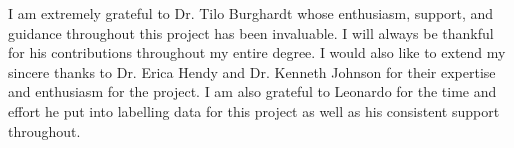 I am extremely grateful to Dr. Tilo Burghardt whose enthusiasm, support, and guidance throughout this project has been invaluable. I will always be thankful for his contributions throughout my entire degree. I would also like to extend my sincere thanks to Dr. Erica Hendy and Dr. Kenneth Johnson for their expertise and enthusiasm for the project. I am also grateful to Leonardo for the time and effort he put into labelling data for this project as well as his consistent support throughout.